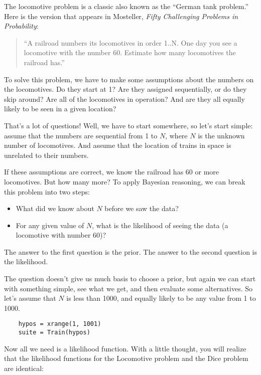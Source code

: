 \documentclass[12pt]{book}
\begin{document}
The locomotive problem is a classic also
known as the ``German tank problem.''  Here is the version
that appears in Mosteller, {\it Fifty Challenging Problems in
  Probability}:

\begin{quote}
``A railroad numbers its locomotives in order 1..N.  One day you see a
locomotive with the number 60.  Estimate how many locomotives the
railroad has.''
\end{quote}

To solve this problem,
we have to make some assumptions about the numbers on the locomotives.
Do they start at 1?  Are they assigned sequentially, or do they
skip around?  Are all of the locomotives in operation?  And are
they all equally likely to be seen in a given location?

That's a lot of questions!  Well, we have to start somewhere, so let's
start simple: assume that the numbers are sequential from 1 to $N$,
where $N$ is the unknown number of locomotives.  And assume that
the location of trains in space is unrelated to their numbers.

If these assumptions are correct, we know the railroad has 60 or more
locomotives.  But how many more?  To apply Bayesian reasoning, we
can break this problem into two steps:

\begin{itemize}

\item What did we know about $N$ before we saw the
data?

\item For any given value of $N$, what is the likelihood of
seeing the data (a locomotive with number 60)?

\end{itemize}

The answer to the first question is the prior.  The answer to the
second question is the likelihood.

The question doesn't give us much basis to choose a prior, but
again we can start with something simple, see what we get, and
then evaluate some alternatives.  So let's assume that $N$ is less
than 1000, and equally likely to be any value from 1 to 1000.

\begin{verbatim}
    hypos = xrange(1, 1001)
    suite = Train(hypos)
\end{verbatim}

Now all we need is a likelihood function.  With a little thought,
you will realize that the likelihood functions for the Locomotive
problem and the Dice problem are identical:
\end{document}
